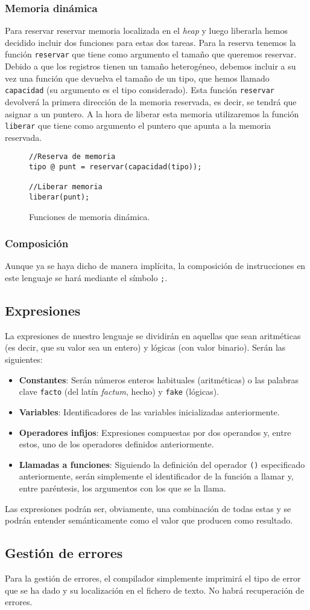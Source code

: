 \subsubsection{Memoria dinámica}
Para reservar reservar memoria localizada en el \textit{heap} y luego liberarla
hemos decidido incluir dos funciones para estas dos tareas. Para la reserva
tenemos la función \lstinline{reservar} que tiene como argumento el tamaño que
queremos reservar. Debido a que los registros tienen un tamaño heterogéneo,
debemos incluir a su vez una función que devuelva el tamaño de un tipo, que
hemos llamado \lstinline{capacidad} (su argumento es el tipo considerado). Esta
función \lstinline{reservar} devolverá la primera dirección de la memoria
reservada, es decir, se tendrá que asignar a un puntero. A la hora de liberar
esta memoria utilizaremos la función \lstinline{liberar} que tiene como
argumento el puntero que apunta a la memoria reservada.
\begin{figure}[htbp]
    \centering
    \begin{lstlisting}
//Reserva de memoria
tipo @ punt = reservar(capacidad(tipo));

//Liberar memoria
liberar(punt);
    \end{lstlisting}
    \caption{Funciones de memoria dinámica.}
\end{figure}

\subsubsection{Composición}
Aunque ya se haya dicho de manera implícita, la composición de instrucciones en
este lenguaje se hará mediante el símbolo \lstinline{;}.

\subsection{Expresiones}
La expresiones de nuestro lenguaje se dividirán en aquellas que sean aritméticas
(es decir, que su valor sea un entero) y lógicas (con valor binario). Serán las
siguientes:
\begin{itemize}
    \item \textbf{Constantes}: Serán números enteros habituales (aritméticas) o
        las palabras clave \lstinline{facto} (del latín \textit{factum}, hecho) y \lstinline{fake} (lógicas).
    \item \textbf{Variables}: Identificadores de las variables inicializadas
        anteriormente.
    \item \textbf{Operadores infijos}: Expresiones compuestas por dos operandos
        y, entre estos, uno de los operadores definidos anteriormente.
    \item \textbf{Llamadas a funciones}: Siguiendo la definición del operador
        \lstinline{()} especificado anteriormente, serán simplemente el
        identificador de la función a llamar y, entre paréntesis, los argumentos
        con los que se la llama.
\end{itemize}
Las expresiones podrán ser, obviamente, una combinación de todas estas y se
podrán entender semánticamente como el valor que producen como resultado.

\subsection{Gestión de errores}
Para la gestión de errores, el compilador simplemente imprimirá el tipo de error
que se ha dado y su localización en el fichero de texto. No habrá recuperación
de errores.
